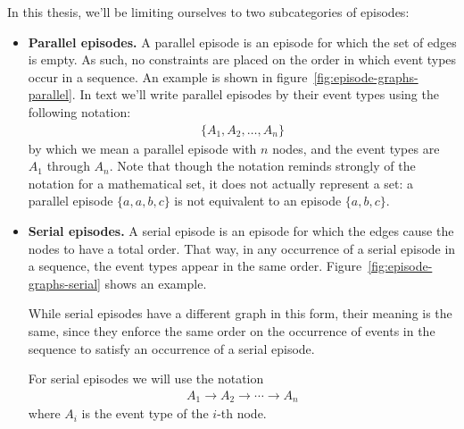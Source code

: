 In this thesis, we'll be limiting ourselves to two subcategories of episodes:
\begin{itemize}
\item \textbf{Parallel episodes.} A parallel episode is an episode for which the set of edges is empty. As such, no constraints are placed on the order in which event types occur in a sequence. An example is shown in figure~\ref{fig:episode-graphs-parallel}. In text we'll write parallel episodes by their event types using the following notation:
\begin{align*}
    \{ A_1, A_2, \ldots, A_n \}
\end{align*}
by which we mean a parallel episode with $ n $ nodes, and the event types are $ A_1 $ through $ A_n $. Note that though the notation reminds strongly of the notation for a mathematical set, it does not actually represent a set: a parallel episode $ \{ a, a, b, c \} $ is not equivalent to an episode $ \{ a, b, c \} $.

\item \textbf{Serial episodes.} A serial episode is an episode for which the edges cause the nodes to have a total order. That way, in any occurrence of a serial episode in a sequence, the event types appear in the same order. Figure~\ref{fig:episode-graphs-serial} shows an example.


While serial episodes have a different graph in this form, their meaning is the same, since they enforce the same order on the occurrence of events in the sequence to satisfy an occurrence of a serial episode.

For serial episodes we will use the notation
\begin{align*}
A_1 \to A_2 \to \cdots \to A_n
\end{align*}
where $ A_i $ is the event type of the $ i $-th node.

\end{itemize}

